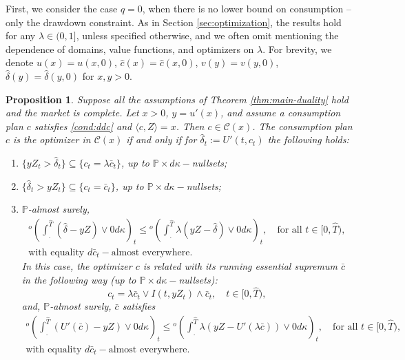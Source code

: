 \documentclass[11pt, oneside]{article}   	%
\theoremstyle{plain}
\newtheorem{prop}[thm]{Proposition}
\theoremstyle{definition}
\theoremstyle{remark}
\begin{document}
First, we consider the case $q=0$, when there is no lower bound on consumption -- only the drawdown constraint. As in Section \ref{sec:optimization}, the results hold for any $\lambda\in(0,1]$, unless specified otherwise, and we often omit mentioning the dependence of domains, value functions, and optimizers on $\lambda$. For brevity, we denote $u(x)=u(x,0)$, $\hat{c}(x)=\hat{c}(x,0)$, $v(y)=v(y,0)$, $\hat{\delta}(y)=\hat{\delta}(y,0)$ for $x,y>0$.
\begin{prop}\label{prop:complete-case}
Suppose all the assumptions of Theorem \ref{thm:main-duality} hold and the market is complete. Let $x>0$, $y=u'(x)$, and assume a consumption plan $c$ satisfies \eqref{cond:ddc} and $\langle c,Z \rangle=x$. Then $c\in\mathcal{C}(x)$. The consumption plan $c$ is the optimizer in $\mathcal{C}(x)$ if and only if for $\hat\delta_t:=U'(t,c_t)$ the following holds:
\begin{enumerate}
\item $\{yZ_t>\hat\delta_t\}\subseteq\{c_t=\lambda\bar{c}_t\}$, up to $\mathbb{P}\times d\kappa-$nullsets;
\item $\{\hat\delta_t>yZ_t\}\subseteq\{c_t=\bar{c}_t\}$, up to $\mathbb{P}\times d\kappa-$nullsets;
\item $\mathbb{P}$-almost surely,
\begin{equation*}
\begin{aligned}
^o\left(\int_.^{\hat{T}} (\hat\delta-yZ)\vee0 d\kappa\right)_t\leq{}^o\left(\int_.^{\hat{T}} \lambda(yZ-\hat\delta)\vee 0 d\kappa\right)_t,\quad\text{for all }t\in[0,\hat{T}),\\
\text{with equality }d\bar{c}_t-\text{almost everywhere.}
\end{aligned}
\end{equation*}
In this case, the optimizer  $c$ is related with its running essential supremum $\bar{c}$ in the following way (up to $\mathbb{P}\times d\kappa-$nullsets):
\begin{equation}\label{eq:c-through-c-bar}
c_t=\lambda\bar{c}_t\vee I(t,yZ_t)\wedge \bar{c}_t,\quad t\in[0,\hat{T}),
\end{equation}
and, $\mathbb{P}$-almost surely, $\bar{c}$ satisfies
\begin{equation}\label{eq:cond-on-c-bar}
\begin{aligned}
^o\left(\int_.^{\hat{T}} (U'(\bar{c})-yZ)\vee0 d\kappa\right)_t\leq{}^o\left(\int_.^{\hat{T}} \lambda(yZ-U'(\lambda\bar{c}))\vee 0 d\kappa\right)_t,\quad\text{for all }t\in[0,{\hat{T}}),\\
\text{with equality }d\bar{c}_t-\text{almost everywhere.}
\end{aligned}
\end{equation}
\end{enumerate}
\end{prop}
\end{document}
